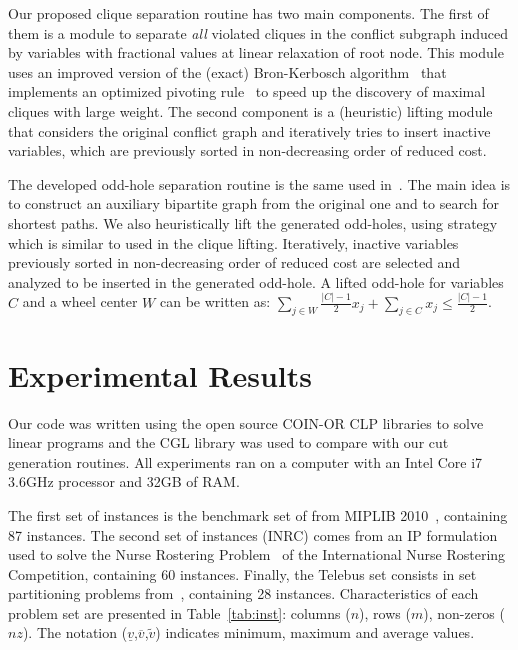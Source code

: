 \documentclass{endm}
\begin{document}
Our proposed clique separation routine has two main components. The first of them is a module to separate \emph{all} violated cliques in the conflict subgraph induced by variables with fractional values at linear relaxation of root node. This module uses an improved version of the (exact) Bron-Kerbosch algorithm~\cite{Bron1973} that implements an optimized pivoting rule~\cite{Brito2011} to speed up the discovery of maximal cliques with large weight. The second component is a (heuristic) lifting module that considers the original conflict graph and iteratively tries to insert inactive variables, which are previously sorted in non-decreasing order of reduced cost. 

The developed odd-hole separation routine is the same used in~\cite{Rebennack2009}. The main idea is to construct an auxiliary bipartite graph from the original one and to search for shortest paths. We also heuristically lift the generated odd-holes, using strategy which is similar to used in the clique lifting. Iteratively, inactive variables previously sorted in non-decreasing order of reduced cost are selected and analyzed to be inserted in the generated odd-hole. A lifted odd-hole for variables $C$ and a wheel center $W$ can be written as: $\displaystyle \sum_{j \in W} \frac{|C|-1}{2} x_{j} + \sum_{j \in C} x_{j} \leq \frac{|C|-1}{2}$.

\section{Experimental Results}\label{experiments}

Our code was written using the open source COIN-OR \cite{LougeeHeimer2003} CLP libraries to solve linear programs and the CGL library was used to compare with our cut generation routines. All experiments ran on a computer with an Intel Core i7 3.6GHz processor and 32GB of RAM.

The first set of instances is the benchmark set of from MIPLIB 2010~\cite{miplib}, containing 87 instances. The second set of instances (INRC) comes from an IP formulation  used to solve the Nurse Rostering Problem~\cite{Santos2014} of the International Nurse Rostering Competition, containing 60 instances. Finally, the Telebus set consists in set partitioning problems from~\cite{Borndorfer1998}, containing 28 instances. Characteristics of each problem set are presented in Table~\ref{tab:inst}: columns ($n$), rows ($m$), non-zeros ($nz$). The notation ($\underline{v}$,$\overline{v}$,$\tilde{v}$) indicates minimum, maximum and average values.
\end{document}
